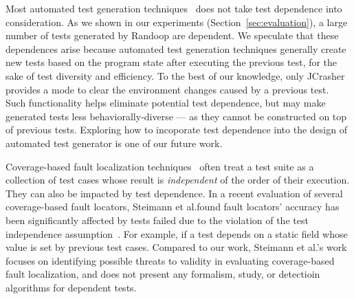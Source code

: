 
Most automated test generation
techniques~\cite{PachecoLET2007, Wang:2007:AGC,
ZhangSBE2011} does not take test dependence
into consideration. As we shown in our experiments (Section~\ref{sec:evaluation}),
a large number of tests generated by Randoop are dependent.
We speculate that these dependences arise because automated
test generation techniques generally create new tests
based on the program state after executing the previous test,
for the sake of test diversity and efficiency. 
To the best of our knowledge, only JCrasher~\cite{Csallner:2004}
provides a mode to clear the environment changes caused
by a previous test. Such functionality helps eliminate
potential test dependence, but may make generated
tests less behaviorally-diverse --- as they cannot be constructed
on top of previous tests. Exploring how to
incoporate test dependence into the design of automated
test generator is one of our future work.

Coverage-based fault localization techniques~\cite{Jones:2002:VTI}
often treat a test suite as a collection of test cases
whose result is \textit{independent} of the order of their
execution. They can also be impacted by test dependence.
In a recent evaluation of several coverage-based fault locators,
 Steimann et al.found fault locators' accuracy has been significantly
 affected by tests failed due to the violation of the test
 independence assumption~\cite{Steimann:2013}. For example,
 if a test depends on a static field whose value is set by
 previous test cases. Compared to our work, Steimann et al.'s
 work focuses on identifying possible threats to validity
 in evaluating coverage-based fault localization, and does
 not present any formalism, study, or detectioin algorithms
 for dependent tests.



